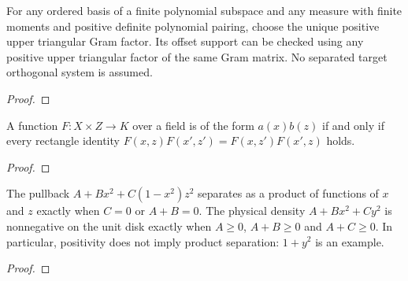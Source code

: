\begin{supporting}
\begin{theorem}
\label{thm:canonical-polynomial-gram-factor}
\leanok
For any ordered basis of a finite polynomial subspace and any measure with
finite moments and positive definite polynomial pairing, choose the unique
positive upper triangular Gram factor. Its offset support can be checked using
any positive upper triangular factor of the same Gram matrix. No separated
target orthogonal system is assumed.
\end{theorem}
\begin{proof}
\leanok
\end{proof}

\begin{theorem}
\label{thm:product-separation-test}
\leanok
A function $F:X\times Z\to K$ over a field is of the form $a(x)b(z)$
if and only if every rectangle identity
$F(x,z)F(x',z')=F(x,z')F(x',z)$ holds.
\end{theorem}
\begin{proof}
\leanok
\end{proof}

\end{supporting}


\begin{theorem}
\label{thm:quadratic-disk-separation}
\leanok
The pullback $A+Bx^2+C(1-x^2)z^2$ separates as a product of functions of
$x$ and $z$ exactly when $C=0$ or $A+B=0$.
The physical density $A+Bx^2+Cy^2$ is nonnegative on the unit disk exactly
when $A\ge0$, $A+B\ge0$ and $A+C\ge0$.
In particular, positivity does not imply product separation: $1+y^2$ is an example.
\end{theorem}
\begin{proof}
\leanok
\end{proof}

